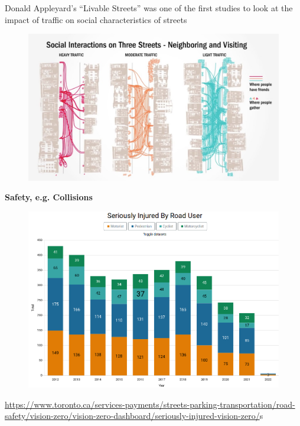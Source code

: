 \documentclass[aspectratio=169]{beamer}
\begin{document}
\begin{frame}
	
	Donald Appleyard’s
	“Livable Streets” was
	one of the first studies
	to look at the impact of
	traffic on social
	characteristics of
	streets
	
	\begin{figure}
		\centering
		\includegraphics[width=0.94\linewidth]{images/Livable-Streets-Donald-Appleyard.jpg}
	\end{figure}
	
\end{frame}








\begin{frame}
	
	\textbf{Safety, e.g. Collisions}
	
	\begin{figure}
		\centering
		\includegraphics[width=0.7\linewidth]{images/injury_road_tor.png}
	\end{figure}
	
	\tiny \url{https://www.toronto.ca/services-payments/streets-parking-transportation/road-safety/vision-zero/vision-zero-dashboard/seriously-injured-vision-zero/}s
	
\end{frame}
\end{document}
